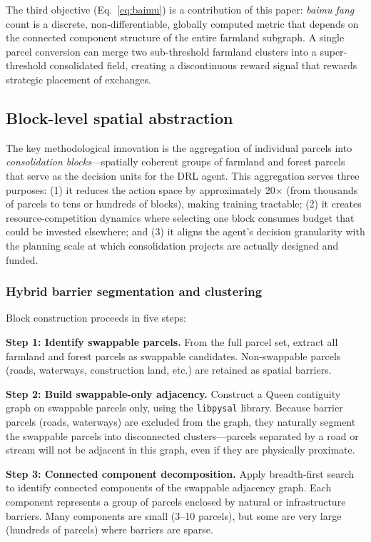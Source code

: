 \documentclass[preprint,12pt]{elsarticle}
\begin{document}
The third objective (Eq.~\ref{eq:baimu}) is a contribution of this paper: \textit{baimu fang} count is a discrete, non-differentiable, globally computed metric that depends on the connected component structure of the entire farmland subgraph. A single parcel conversion can merge two sub-threshold farmland clusters into a super-threshold consolidated field, creating a discontinuous reward signal that rewards strategic placement of exchanges.

\subsection{Block-level spatial abstraction}
\label{sec:blocks}

The key methodological innovation is the aggregation of individual parcels into \textit{consolidation blocks}---spatially coherent groups of farmland and forest parcels that serve as the decision units for the DRL agent. This aggregation serves three purposes: (1) it reduces the action space by approximately 20$\times$ (from thousands of parcels to tens or hundreds of blocks), making training tractable; (2) it creates resource-competition dynamics where selecting one block consumes budget that could be invested elsewhere; and (3) it aligns the agent's decision granularity with the planning scale at which consolidation projects are actually designed and funded.

\subsubsection{Hybrid barrier segmentation and clustering}

Block construction proceeds in five steps:

\textbf{Step 1: Identify swappable parcels.} From the full parcel set, extract all farmland and forest parcels as swappable candidates. Non-swappable parcels (roads, waterways, construction land, etc.) are retained as spatial barriers.

\textbf{Step 2: Build swappable-only adjacency.} Construct a Queen contiguity graph on swappable parcels only, using the \texttt{libpysal} library. Because barrier parcels (roads, waterways) are excluded from the graph, they naturally segment the swappable parcels into disconnected clusters---parcels separated by a road or stream will not be adjacent in this graph, even if they are physically proximate.

\textbf{Step 3: Connected component decomposition.} Apply breadth-first search to identify connected components of the swappable adjacency graph. Each component represents a group of parcels enclosed by natural or infrastructure barriers. Many components are small (3--10 parcels), but some are very large (hundreds of parcels) where barriers are sparse.
\end{document}
